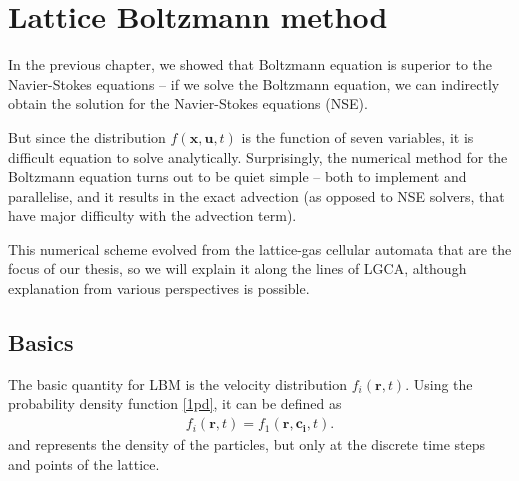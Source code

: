\chapter{Lattice Boltzmann method}

In the previous chapter, we showed that Boltzmann equation is superior to the Navier-Stokes equations -- if we solve the Boltzmann equation, we can indirectly obtain the solution for the Navier-Stokes equations (NSE).

But since the distribution $f(\bm{x},\bm{u},t)$ is the function of seven variables, it is difficult equation to solve analytically.
Surprisingly, the numerical method for the Boltzmann equation turns out to be quiet simple -- both to implement and parallelise, and it results in the exact advection (as opposed to NSE solvers, that have major difficulty with the advection term). 

This numerical scheme evolved from the lattice-gas cellular automata that are the focus of our thesis, so we will explain it along the lines of LGCA, although explanation from various perspectives is possible.


%
\section{Basics}
The basic quantity for LBM is the velocity distribution $f_i(\bm{r},t)$.
Using the probability density function \ref{1pd}, it can be defined as
\begin{align*}
f_i(\bm{r},t) = f_1(\bm{r}, \bm{c_i}, t).
\end{align*}
and represents the density of the particles, but only at the discrete time steps and points of the lattice.


